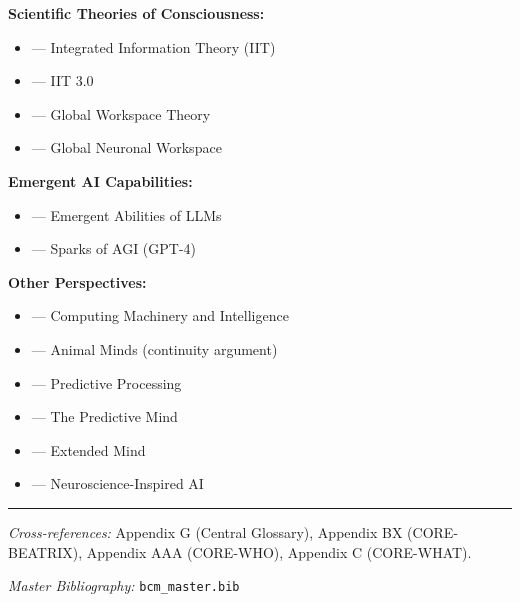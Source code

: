 \textbf{Scientific Theories of Consciousness:}
\begin{itemize}[nosep]
    \item \citet{PAP-tononi2004information} --- Integrated Information Theory (IIT)
    \item \citet{PAP-tononi2016integrated} --- IIT 3.0
    \item \citet{PAP-baars1988cognitive} --- Global Workspace Theory
    \item \citet{PAP-dehaene2011experimental} --- Global Neuronal Workspace
\end{itemize}

\textbf{Emergent AI Capabilities:}
\begin{itemize}[nosep]
    \item \citet{PAP-wei2022emergent} --- Emergent Abilities of LLMs
    \item \citet{PAP-bubeck2023sparks} --- Sparks of AGI (GPT-4)
\end{itemize}

\textbf{Other Perspectives:}
\begin{itemize}[nosep]
    \item \citet{PAP-turing1950computing} --- Computing Machinery and Intelligence
    \item \citet{PAP-griffin1992animal} --- Animal Minds (continuity argument)
    \item \citet{PAP-clark2015surfing} --- Predictive Processing
    \item \citet{PAP-hohwy2013predictive} --- The Predictive Mind
    \item \citet{PAP-clark1998extended} --- Extended Mind
    \item \citet{PAP-hassabis2017neuroscience} --- Neuroscience-Inspired AI
\end{itemize}

\nocite{bcm_master}



\vspace{1em}
\hrule
\vspace{0.5em}

\noindent\textit{Cross-references:}
Appendix G (Central Glossary),
Appendix BX (CORE-BEATRIX),
Appendix AAA (CORE-WHO),
Appendix C (CORE-WHAT).

\noindent\textit{Master Bibliography:} \texttt{bcm\_master.bib}



